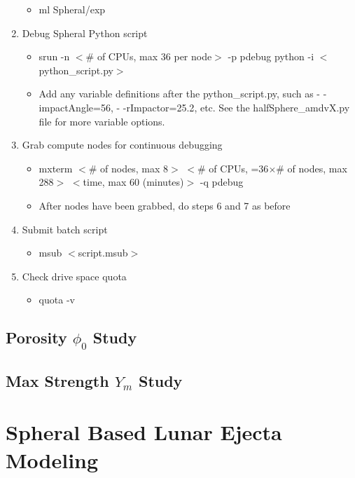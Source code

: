 \documentclass{hitec}
\begin{document}
\begin{enumerate}
	\begin{itemize}
		\item \textsf{ml Spheral/exp}
	\end{itemize}
	\item Debug Spheral Python script
	\begin{itemize}
		\item \textsf{srun -n $<$\# of CPUs, max 36 per node$>$ -p pdebug python -i $<$python\_script.py$>$}
		\item Add any variable definitions after the \textsf{python\_script.py}, such as \textsf{- -impactAngle=56}, \textsf{- -rImpactor=25.2}, etc. See the \textsf{halfSphere\_amdvX.py} file for more variable options.
	\end{itemize}
	\item Grab compute nodes for continuous debugging
	\begin{itemize}
		\item \textsf{mxterm $<$\# of nodes, max 8$>$ $<$\# of CPUs, =36$\times$\# of nodes, max 288$>$ $<$time, max 60 (minutes)$>$ -q pdebug}
		\item After nodes have been grabbed, do steps 6 and 7 as before 
	\end{itemize}
	\item Submit batch script
	\begin{itemize}
		\item \textsf{msub} $<$script.msub$>$
	\end{itemize}
	\item Check drive space quota
	\begin{itemize}
		\item \textsf{quota -v}
	\end{itemize}
\end{enumerate}


\subsection{Porosity $\phi_0$ Study}




\subsection{Max Strength $Y_m$ Study}


\section{Spheral Based Lunar Ejecta Modeling}
\label{sec:Spheral Based Lunar Ejecta Modeling}
\end{document}
